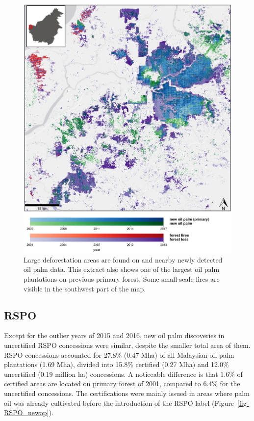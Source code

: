 \documentclass[
  letterpaper,
  DIV=11,
  numbers=noendperiod]{scrreprt}
\begin{document}
\begin{figure}

{\centering \includegraphics{text/../code/results/maps/deforestation_op_fires.png}

}

\caption{\label{fig-map_deforestation_op_fires}Large deforestation areas
are found on and nearby newly detected oil palm data. This extract also
shows one of the largest oil palm plantations on previous primary
forest. Some small-scale fires are visible in the southwest part of the
map.}

\end{figure}

\hypertarget{sec-resultsrspo}{%
\subsection{RSPO}\label{sec-resultsrspo}}

Except for the outlier years of 2015 and 2016, new oil palm discoveries
in uncertified RSPO concessions were similar, despite the smaller total
area of them. RSPO concessions accounted for 27.8\% (0.47 Mha) of all
Malaysian oil palm plantations (1.69 Mha), divided into 15.8\% certified
(0.27 Mha) and 12.0\% uncertified (0.19 million ha) concessions. A
noticeable difference is that 1.6\% of certified areas are located on
primary forest of 2001, compared to 6.4\% for the uncertified
concessions. The certifications were mainly issued in areas where palm
oil was already cultivated before the introduction of the RSPO label
(Figure~\ref{fig-RSPO_newop}).
\end{document}

